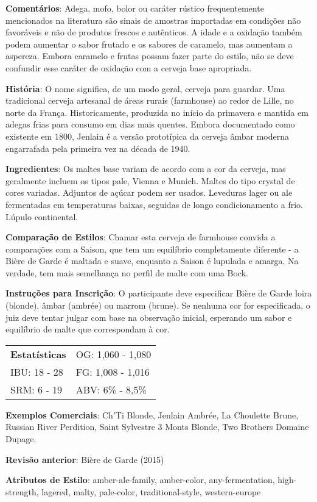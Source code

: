 \textbf{Comentários}: Adega, mofo, bolor ou caráter rústico frequentemente mencionados na literatura são sinais de amostras importadas em condições não favoráveis e não de produtos frescos e autênticos. A idade e a oxidação também podem aumentar o sabor frutado e os sabores de caramelo, mas aumentam a aspereza. Embora caramelo e frutas possam fazer parte do estilo, não se deve confundir esse caráter de oxidação com a cerveja base apropriada.

\textbf{História}: O nome significa, de um modo geral, cerveja para guardar. Uma tradicional cerveja artesanal de áreas rurais (farmhouse) ao redor de Lille, no norte da França. Historicamente, produzida no início da primavera e mantida em adegas frias para consumo em dias mais quentes. Embora documentado como existente em 1800, Jenlain é a versão prototípica da cerveja âmbar moderna engarrafada pela primeira vez na década de 1940.

\textbf{Ingredientes}: Os maltes base variam de acordo com a cor da cerveja, mas geralmente incluem os tipos pale, Vienna e Munich. Maltes do tipo crystal de cores variadas. Adjuntos de açúcar podem ser usados. Leveduras lager ou ale fermentadas em temperaturas baixas, seguidas de longo condicionamento a frio. Lúpulo continental.

\textbf{Comparação de Estilos}: Chamar esta cerveja de farmhouse convida a comparações com a Saison, que tem um equilíbrio completamente diferente - a Bière de Garde é maltada e suave, enquanto a Saison é lupulada e amarga. Na verdade, tem mais semelhança no perfil de malte com uma Bock.

\textbf{Instruções para Inscrição}: O participante deve especificar Bière de Garde loira (blonde), âmbar (ambrée) ou marrom (brune). Se nenhuma cor for especificada, o juiz deve tentar julgar com base na observação inicial, esperando um sabor e equilíbrio de malte que correspondam à cor.

\begin{tabular}{@{}p{35mm}p{35mm}@{}}
  \textbf{Estatísticas} & OG: 1,060 - 1,080 \\
  IBU: 18 - 28  & FG: 1,008 - 1,016  \\
  SRM: 6 - 19  & ABV: 6\% - 8,5\%
\end{tabular}

\textbf{Exemplos Comerciais}: Ch’Ti Blonde, Jenlain Ambrée, La Choulette Brune, Russian River Perdition, Saint Sylvestre 3 Monts Blonde, Two Brothers Domaine Dupage.

\textbf{Revisão anterior}: Bière de Garde (2015)

\textbf{Atributos de Estilo}: amber-ale-family, amber-color, any-fermentation, high-strength, lagered, malty, pale-color, traditional-style, western-europe
